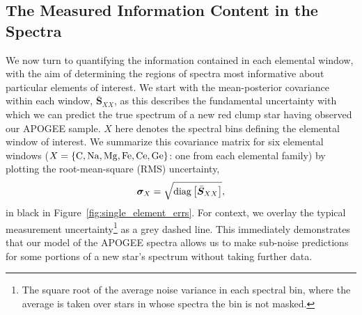 \documentclass[a4paper,fleqn,usenatbib]{mnras}
\newcommand{\speccov}{{\bm S}}
\begin{document}
\subsection{The Measured Information Content in the Spectra}

We now turn to quantifying the information contained in each elemental window, with the aim of determining the regions of spectra most informative about particular elements of interest. We start with the mean-posterior covariance within each window, $\bar{\speccov}_{XX}$, as this describes the fundamental uncertainty with which we can predict the true spectrum of a new red clump star having observed our APOGEE sample. $X$ here denotes the spectral bins defining the elemental window of interest. We summarize this covariance matrix for six elemental windows ($X=\{{\rm C, Na, Mg, Fe, Ce, Ge}\}$: one from each elemental family) by plotting the root-mean-square (RMS) uncertainty,
\begin{equation}
\bm{\sigma}_X = \sqrt{{\rm diag} \left[\bar{\speccov}_{XX}\right]},
\end{equation}
in black in Figure~\ref{fig:single_element_errs}. For context, we overlay the typical measurement uncertainty\footnote{The square root of the average noise variance in each spectral bin, where the average is taken over stars in whose spectra the bin is not masked.} as a grey dashed line. This immediately demonstrates that our model of the APOGEE spectra allows us to make sub-noise predictions for some portions of a new star's spectrum without taking further data.
\end{document}
